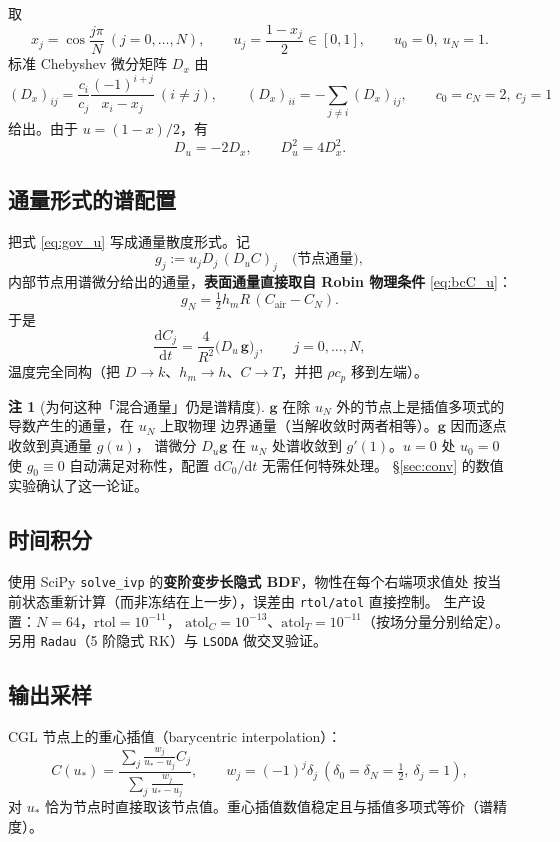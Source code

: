 \documentclass[11pt,a4paper]{article}
\theoremstyle{definition}
\newtheorem{remark}{注}
\begin{document}
取
\[
x_j=\cos\frac{j\pi}{N}\ (j=0,\dots,N),\qquad
u_j=\frac{1-x_j}{2}\in[0,1],\qquad u_0=0,\ u_N=1 .
\]
标准 Chebyshev 微分矩阵 $D_x$ 由
\[
(D_x)_{ij}=\frac{c_i}{c_j}\frac{(-1)^{i+j}}{x_i-x_j}\ (i\ne j),\qquad
(D_x)_{ii}=-\sum_{j\ne i}(D_x)_{ij},
\qquad c_0=c_N=2,\ c_j=1
\]
给出。由于 $u=(1-x)/2$，有
\[
D_u=-2D_x,\qquad D_u^2=4D_x^2 .
\]

\subsection{通量形式的谱配置}

把式 \eqref{eq:gov_u} 写成通量散度形式。记
\[
g_j:=u_jD_j\,(D_uC)_j\quad\text{(节点通量)},
\]
内部节点用谱微分给出的通量，\textbf{表面通量直接取自 Robin 物理条件}
\eqref{eq:bcC_u}：
\[
g_N=\tfrac12 h_mR\,(C_{\mathrm{air}}-C_N).
\]
于是
\begin{equation}
\frac{\mathrm{d}C_j}{\mathrm{d}t}=\frac{4}{R^2}\big(D_u\,\mathbf{g}\big)_j,
\qquad j=0,\dots,N,
\label{eq:fluxform}
\end{equation}
温度完全同构（把 $D\to k$、$h_m\to h$、$C\to T$，并把 $\rho c_p$ 移到左端）。

\begin{remark}[为何这种「混合通量」仍是谱精度]
$\mathbf{g}$ 在除 $u_N$ 外的节点上是插值多项式的导数产生的通量，在 $u_N$ 上取物理
边界通量（当解收敛时两者相等）。$\mathbf{g}$ 因而逐点收敛到真通量 $g(u)$，
谱微分 $D_u\mathbf{g}$ 在 $u_N$ 处谱收敛到 $g'(1)$。$u=0$ 处 $u_0=0$ 使 $g_0\equiv0$
自动满足对称性，配置 $\mathrm{d}C_0/\mathrm{d}t$ 无需任何特殊处理。
\S\ref{sec:conv} 的数值实验确认了这一论证。
\end{remark}

\subsection{时间积分}

使用 SciPy \texttt{solve\_ivp} 的\textbf{变阶变步长隐式 BDF}，物性在每个右端项求值处
按当前状态重新计算（而非冻结在上一步），误差由 \texttt{rtol/atol} 直接控制。
生产设置：$N=64$，$\mathrm{rtol}=10^{-11}$，
$\mathrm{atol}_C=10^{-13}$、$\mathrm{atol}_T=10^{-11}$（按场分量分别给定）。
另用 \texttt{Radau}（5 阶隐式 RK）与 \texttt{LSODA} 做交叉验证。

\subsection{输出采样}

CGL 节点上的重心插值（barycentric interpolation）：
\[
C(u_*)=\frac{\sum_j \frac{w_j}{u_*-u_j}C_j}{\sum_j \frac{w_j}{u_*-u_j}},
\qquad w_j=(-1)^j\delta_j\ (\delta_0=\delta_N=\tfrac12,\ \delta_j=1),
\]
对 $u_*$ 恰为节点时直接取该节点值。重心插值数值稳定且与插值多项式等价（谱精度）。
\end{document}
